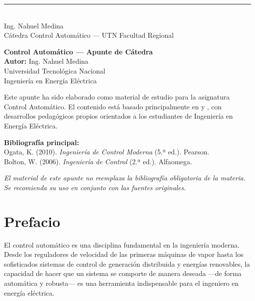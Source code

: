 \documentclass[12pt, a4paper, twoside, openany]{book}
\begin{document}
\begin{titlepage}
\begin{center}
  \vfill

  {\color{utnblue}\rule{0.5\textwidth}{1pt}}\\[0.5em]
  {\color{utngray}\large Ing. Nahuel Medina}\\[0.2em]
  {\color{utngray}Cátedra Control Automático --- UTN Facultad Regional}\\[0.3em]
  {\color{utngray}\the\year}
\end{center}
\end{titlepage}

\thispagestyle{empty}
\vspace*{\fill}
\noindent\textbf{Control Automático — Apunte de Cátedra}\\
\textbf{Autor:} Ing. Nahuel Medina\\
Universidad Tecnológica Nacional\\
Ingeniería en Energía Eléctrica

\medskip
\noindent Este apunte ha sido elaborado como material de estudio para la
asignatura Control Automático. El contenido está basado principalmente en
\cite{ogata2010} y \cite{bolton2006}, con desarrollos pedagógicos propios
orientados a los estudiantes de Ingeniería en Energía Eléctrica.

\medskip
\noindent\textbf{Bibliografía principal:}\\
Ogata, K. (2010). \textit{Ingeniería de Control Moderna} (5.ª ed.). Pearson.\\
Bolton, W. (2006). \textit{Ingeniería de Control} (2.ª ed.). Alfaomega.

\medskip
\noindent\textit{El material de este apunte no reemplaza la bibliografía obligatoria
de la materia. Se recomienda su uso en conjunto con las fuentes originales.}

\vspace*{\fill}
\newpage

\chapter*{Prefacio}

El control automático es una disciplina fundamental en la ingeniería moderna.
Desde los reguladores de velocidad de las primeras máquinas de vapor hasta los
sofisticados sistemas de control de generación distribuida y energías renovables,
la capacidad de hacer que un sistema se comporte de manera deseada —de forma
automática y robusta— es una herramienta indispensable para el ingeniero
en energía eléctrica.
\end{document}
